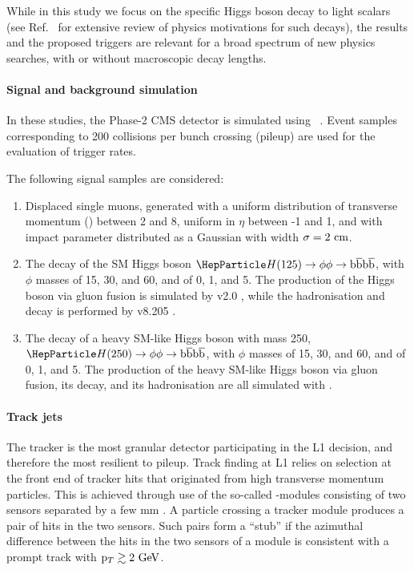 While in this study we focus on the specific Higgs boson decay to light scalars (see Ref.~\cite{bsmh} for extensive review of physics motivations for such decays),
the results and the proposed triggers are relevant for a broad spectrum of new physics searches, with or without macroscopic decay lengths.

\paragraph{Signal and background simulation}

In these studies, the Phase-2 CMS detector is simulated using \GEANTfour~\cite{geant}.
Event samples corresponding to 200 collisions per bunch crossing (pileup) \cite{cmstdr-017} are used for the evaluation of trigger rates.

The following signal samples are considered:
\begin{enumerate}
\item Displaced single muons, generated with a uniform distribution of transverse momentum (\pt) between 2 and 8\UGeV, uniform
in $\eta$ between -1 and 1, and with impact parameter \dtrans distributed as a Gaussian with width $\sigma=2~\text{cm}$.
\item The decay of the SM Higgs boson $\PH(125)\to \phi\phi\to \bbbar\bbbar$, with $\phi$ masses of 15, 30, and 60\UGeV, and \ctau of 0, 1, and 5\Ucm.
The production of the Higgs boson via gluon fusion is simulated by \POWHEG v2.0 \cite{powheg}, while the hadronisation and decay is performed by \PYTHIA v8.205 \cite{pythia}.
\item The decay of a heavy SM-like Higgs boson with mass 250\UGeV, $\PH(250)\to \phi\phi\to \bbbar\bbbar$, with $\phi$ masses of 15, 30, and 60\UGeV, and \ctau of 0, 1, and 5\Ucm.
The production of the heavy SM-like Higgs boson via gluon fusion, its decay, and its hadronisation are all simulated with  \cite{pythia}.
\end{enumerate}

\paragraph{Track jets}
\label{sec:trackjets}

The tracker is the most granular detector participating in the L1 decision, and therefore the most resilient to pileup. 
Track finding at L1 relies on selection at the front end of tracker hits that originated from high transverse momentum particles.
This is achieved through use of the so-called \pt-modules consisting of two sensors separated by a few mm \cite{cmstdr-014}. A particle crossing a tracker module
produces a pair of hits in the two sensors. Such pairs form a ``stub'' if the azimuthal difference between the hits in the two sensors of a module is consistent
with a prompt track with $\mathrm{p}_{T} \gtrsim 2~\text{GeV}$.

